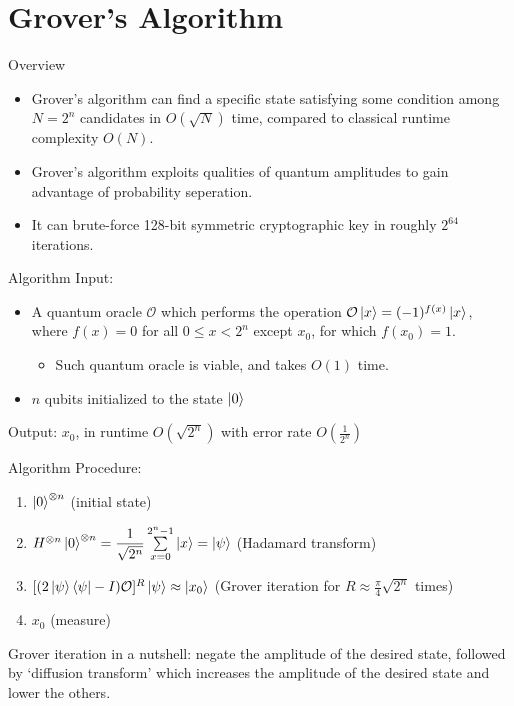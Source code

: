 \documentclass{beamer}
\begin{document}
	\section{Grover's Algorithm}
	
	\begin{frame}{Overview}
		\begin{itemize}
			\item Grover's algorithm can find a specific state satisfying some condition among $ N = 2^n$ candidates in $ O(\sqrt{N}) $ time, compared to classical runtime complexity $ O(N) $.
			\item Grover's algorithm exploits qualities of quantum amplitudes to gain advantage of probability seperation.
			\item It can brute-force 128-bit symmetric cryptographic key in roughly $ 2^{64} $ iterations.
		\end{itemize}
	\end{frame}
	
	\begin{frame}{Algorithm}
		Input:
		\begin{itemize}
			\item A quantum oracle $ \mathcal{O} $ which performs the operation $ \mathcal{O} \ket{x}  = (-1)^{f(x)} \ket{x}$, where $ f(x) = 0 $ for all $0 \leq x < 2^n $ except $ x_0 $, for which $ f(x_0) = 1 $.
			\begin{itemize}
				\item Such quantum oracle is viable, and takes $ O(1) $ time.
			\end{itemize}
			\item $ n $ qubits initialized to the state $ \ket{0} $
		\end{itemize}
		Output: $ x_0 $, in runtime $ O(\sqrt{2^n}) $ with error rate $ O(\frac{1}{2^n}) $
	\end{frame}
	
	\begin{frame}{Algorithm}
		Procedure:
		\begin{enumerate}
			\item $ \ket{0}^{\otimes n} $ (initial state)
			\item $ H^{\otimes n} \ket{0}^{\otimes n} = \dfrac{1}{\sqrt{2^n}} \sum\limits_{x=0}^{2^n-1}\ket{x} = \ket{\psi}$ (Hadamard transform)
			\item $ [(2 \ket{\psi} \bra{\psi} - I) \mathcal{O}]^R \ket{\psi} \approx \ket{x_0}  $ (Grover iteration for $ R \approx  \frac{\pi}{4}\sqrt{2^n} $ times)
			\item $ x_0 $ (measure)
		\end{enumerate}
		Grover iteration in a nutshell: negate the amplitude of the desired state, followed by `diffusion transform' which increases the amplitude of the desired state and lower the others.
	\end{frame}
	
\end{document}
